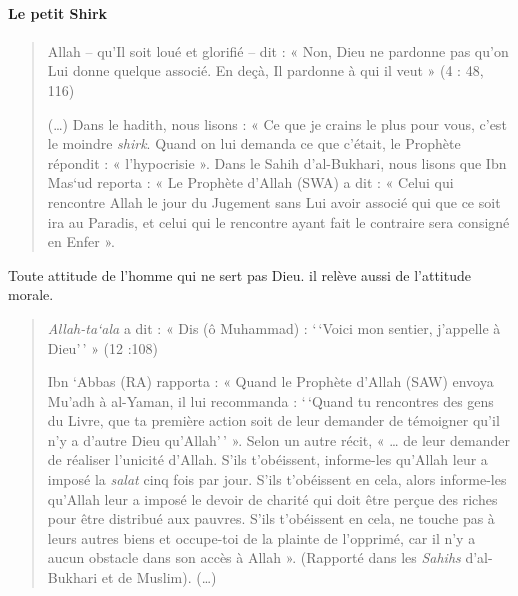 \paragraph{Le petit Shirk} 
\begin{quote}
Allah -- qu'Il soit loué et glorifié -- dit : « Non, Dieu ne pardonne
pas qu'on Lui donne quelque associé. En deçà, Il pardonne à qui il veut
» (4 : 48, 116)

(\ldots) Dans le hadith, nous lisons : « Ce que je crains le plus pour
vous, c'est le moindre \emph{shirk}. Quand on lui demanda ce que
c'était, le Prophète répondit : « l'hypocrisie ». Dans le Sahih
d'al-Bukhari, nous lisons que Ibn Mas`ud reporta : « Le Prophète d'Allah
(SWA) a dit : « Celui qui rencontre Allah le jour du Jugement sans Lui
avoir associé qui que ce soit ira au Paradis, et celui qui le rencontre
ayant fait le contraire sera consigné en Enfer ».
\end{quote}
\begin{Def}
Toute attitude de l'homme qui ne sert pas Dieu. il relève aussi de l'attitude morale.
\end{Def}

\begin{Ex}

\begin{quote}
\emph{Allah-ta`ala} a dit : « Dis (ô Muhammad) : `\,`Voici mon sentier,
j'appelle à Dieu'\,' » (12 :108)

Ibn `Abbas (RA) rapporta : « Quand le Prophète d'Allah (SAW) envoya
Mu'adh à al-Yaman, il lui recommanda : `\,`Quand tu rencontres des gens
du Livre, que ta première action soit de leur demander de témoigner
qu'il n'y a d'autre Dieu qu'Allah'\,' ». Selon un autre récit, «
\ldots{} de leur demander de réaliser l'unicité d'Allah. S'ils
t'obéissent, informe-les qu'Allah leur a imposé la \emph{salat} cinq
fois par jour. S'ils t'obéissent en cela, alors informe-les qu'Allah
leur a imposé le devoir de charité qui doit être perçue des riches pour
être distribué aux pauvres. S'ils t'obéissent en cela, ne touche pas à
leurs autres biens et occupe-toi de la plainte de l'opprimé, car il n'y a aucun obstacle dans son accès à Allah ».
(Rapporté dans les \emph{Sahihs} d'al-Bukhari et de Muslim). (\ldots)
\end{quote}
\end{Ex}



